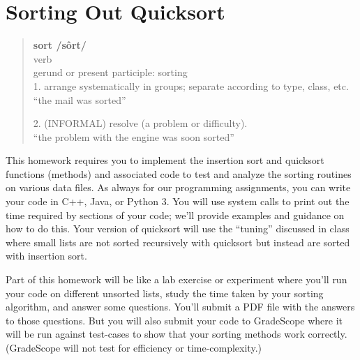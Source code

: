 \documentclass[11pt]{article}
\begin{document}
\section*{Sorting Out Quicksort}



\begin{quote}
\textbf{sort  /sôrt/ }\\
verb \\
gerund or present participle: sorting \\
1. arrange systematically in groups; separate according to type, class, etc. \\
``the mail was sorted''

2. (INFORMAL) resolve (a problem or difficulty). \\
``the problem with the engine was soon sorted''
\end{quote}

This homework requires you to implement the insertion sort and quicksort functions (methods) and associated code to test and analyze the sorting routines on various data files. As always for our programming assignments, you can write your code in C++, Java, or Python 3. You will use system calls to print out the time required by sections of your code; we'll provide examples and guidance on how to do this.  Your version of quicksort will use the ``tuning'' discussed in class where small lists are not sorted recursively with quicksort but instead are sorted with insertion sort.

Part of this homework will be like a lab exercise or experiment where you'll run your code on different unsorted lists, study the time taken by your sorting algorithm, and answer some questions. You'll submit a PDF file with the answers to those questions.  But you will also submit your code to GradeScope where it will be run against test-cases to show that your sorting methods work correctly. (GradeScope will not test for efficiency or time-complexity.)
\end{document}
